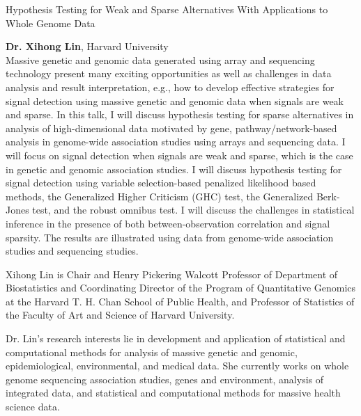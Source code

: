 
\begin{center}
\Large Hypothesis Testing for Weak and Sparse Alternatives With
Applications to Whole Genome Data \\[1em]
\end{center}
\normalsize \textbf{Dr. Xihong Lin}, Harvard University \\[.5em]

Massive genetic and genomic data generated using array and sequencing
technology present many exciting opportunities as well as challenges
in data analysis and result interpretation, e.g., how to develop
effective strategies for signal detection using massive genetic and
genomic data when signals are weak and sparse. In this talk, I will
discuss hypothesis testing for sparse alternatives in analysis of
high-dimensional data motivated by gene, pathway/network-based
analysis in genome-wide association studies using arrays and
sequencing data. I will focus on signal detection when signals are
weak and sparse, which is the case in genetic and genomic association
studies. I will discuss hypothesis testing for signal detection using
variable selection-based penalized likelihood based methods, the
Generalized Higher Criticism (GHC) test, the Generalized
Berk-Jones test, and the robust omnibus test. I will discuss the
challenges in statistical inference in the presence of both
between-observation correlation and signal sparsity. The results are
illustrated using data from genome-wide association studies and
sequencing studies.

\hrulefill

\small Xihong Lin is Chair and Henry Pickering Walcott Professor of
Department of Biostatistics and Coordinating Director of the Program
of Quantitative Genomics at the Harvard T. H. Chan School of Public
Health, and Professor of Statistics of the Faculty of Art and Science
of Harvard University.

Dr. Lin's research interests lie in development
and application of statistical and computational methods for analysis
of massive genetic and genomic, epidemiological, environmental, and
medical data. She currently works on whole genome sequencing
association studies, genes and environment, analysis of integrated
data, and statistical and computational methods for massive health
science data.

